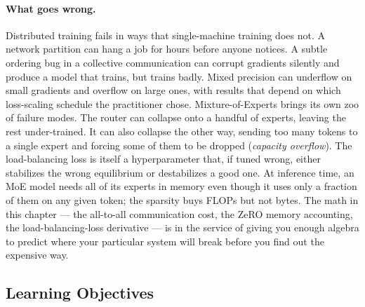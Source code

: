 \paragraph{What goes wrong.}
Distributed training fails in ways that single-machine training does
not. A network partition can hang a job for hours before anyone
notices. A subtle ordering bug in a collective communication can
corrupt gradients silently and produce a model that trains, but
trains badly. Mixed precision can underflow on small gradients and
overflow on large ones, with results that depend on which loss-scaling
schedule the practitioner chose. Mixture-of-Experts brings its own
zoo of failure modes. The router can collapse onto a handful of
experts, leaving the rest under-trained. It can also collapse the
other way, sending too many tokens to a single expert and forcing
some of them to be dropped (\emph{capacity overflow}). The
load-balancing loss is itself a hyperparameter that, if tuned wrong,
either stabilizes the wrong equilibrium or destabilizes a good one.
At inference time, an MoE model needs all of its experts in memory
even though it uses only a fraction of them on any given token; the
sparsity buys FLOPs but not bytes. The math in this chapter --- the
all-to-all communication cost, the ZeRO memory accounting, the
load-balancing-loss derivative --- is in the service of giving you
enough algebra to predict where your particular system will break
before you find out the expensive way.

\subsection{Learning Objectives}

